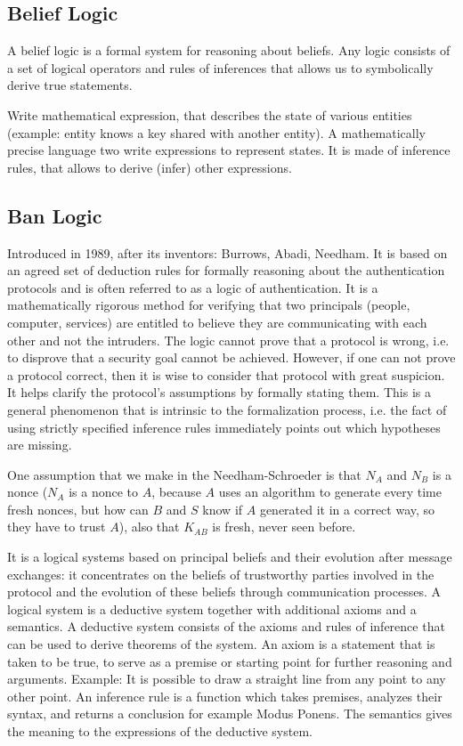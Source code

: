 \subsection{Belief Logic}

A belief logic is a formal system for reasoning about beliefs. Any logic consists of a set of logical operators and rules of inferences that allows us to symbolically derive true statements.

Write mathematical expression, that describes the state of various entities (example: entity knows a key shared with another entity). A mathematically precise language two write expressions to represent states. It is made of inference rules, that allows to derive (infer) other expressions. 

\subsection{Ban Logic}

Introduced in 1989, after its inventors: Burrows, Abadi, Needham. It is based on an agreed set of deduction rules for formally reasoning about the authentication protocols and is often referred to as a logic of authentication. It is a mathematically rigorous method for verifying that two principals (people, computer, services) are entitled to believe they are communicating with each other and not the intruders. The logic cannot prove that a protocol is wrong, i.e. to disprove that a security goal cannot be achieved. However, if one can not prove a protocol correct, then it is wise to consider that protocol with great suspicion.
It helps clarify the protocol’s assumptions by formally stating them. This is a general phenomenon that is intrinsic to the formalization process, i.e. the fact of using strictly specified inference rules immediately points out which hypotheses are missing.

One assumption that we make in the Needham-Schroeder is that $N_A$ and $N_B$ is a nonce ($N_A$ is a nonce to $A$, because $A$ uses an algorithm to generate every time fresh nonces, but how can $B$ and $S$ know if $A$ generated it in a correct way, so they have to trust $A$), also that $K_{AB}$ is fresh, never seen before.

It is a logical systems based on principal beliefs and their evolution after message exchanges: it concentrates on the beliefs of trustworthy parties involved in the protocol and the evolution of these beliefs through communication processes. A logical system is a deductive system together with additional axioms and a semantics. A deductive system consists of the axioms and rules of inference that can be used to derive theorems of the system. An axiom is a statement that is taken to be true, to serve as a premise or starting point for further reasoning and arguments.
Example: It is possible to draw a straight line from any point to any other point. An inference rule is a function which takes premises, analyzes their syntax, and returns a conclusion for example Modus Ponens.
The semantics gives the meaning to the expressions of the deductive system.

